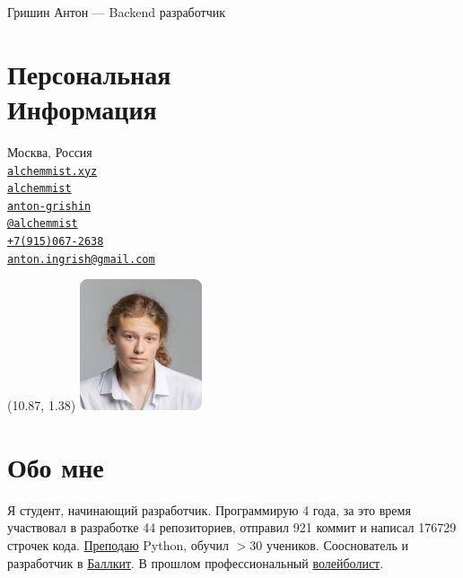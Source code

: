 \documentclass[margin,line]{resume}
\begin{document}
{\vspace*{-13mm}\sc \large Гришин Антон — Backend разработчик} \\
\begin{resume}
  \begin{minipage}[t]{0.55\textwidth}
    \section{\mysidestyle Персональная\\Информация}
    Москва, Россия \\
    \faHome  \space
    \href{https://alchemmist.xyz}{\texttt{alchemmist.xyz}} \\
    \faGithub  \space
    \href{https://github.com/alchemmist/}{\texttt{alchemmist}} \\
    \faLinkedin \space
    \href{https://www.linkedin.com/in/anton-grishin-6966a8362/}{\texttt{anton-grishin}}
    \\
    \faPaperPlane \space \href{https://t.me/alchemmist}{\texttt{@alchemmist}} \\
    \faPhone \space
    \href{tel:+1234567890}{\color{blue}\texttt{+7(915)067-2638}}  \\
    \faEnvelope \space
    \href{mailto:anton.ingrish@gmail.com}{\color{blue}\texttt{anton.ingrish@gmail.com}}
  \end{minipage}

  \begin{minipage}[H]{0.18\textwidth}
    \begin{textblock}{7}(10.87, 1.38)
      \includegraphics[width=0.270\textwidth]{../images/avatar.png}
    \end{textblock}
  \end{minipage}

  \vspace{-7mm}
  \section{\mysidestyle Обо мне}
  Я студент, начинающий разработчик. Программирую 4 года, за
  это время участвовал в разработке 44 репозиториев, отправил 921
  коммит и написал 176729 строчек кода.
  \href{https://www.avito.ru/moskva/predlozheniya_uslug/prepodavatel_programmirovaniya_na_python_2556461612}{Преподаю}
  Python, обучил $> 30$ учеников. Сооснователь и
  разработчик в \href{https://ballkit.ru/}{Баллкит}. В прошлом профессиональный
  \href{https://alchemmist.github.io/CV/attachments/sport.pdf}{волейболист}.


\end{resume}
\end{document}
